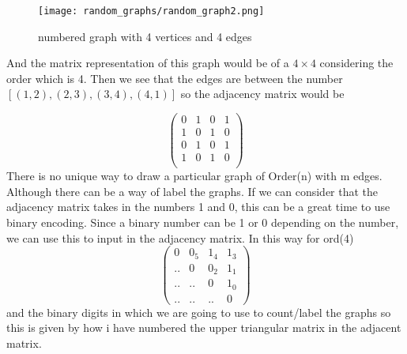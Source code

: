 \documentclass[12pt, a4paper]{Assignment}
\begin{document}
\begin{figure}[H]
	\centering
	\texttt{[image: random\_graphs/random\_graph2.png]}
	\caption{numbered graph with 4 vertices and 4 edges}
	\label{random_graph2}
\end{figure}
And the matrix representation of this graph would be of a $4\times 4$ considering the order which is 4.
Then we see that the edges are between the number $[(1,2), (2,3), (3,4), (4,1)]$ so the adjacency matrix would be

\begin{equation}
\begin{pmatrix}
0& 1& 0& 1\\
1 & 0 & 1 & 0\\
0 & 1 & 0 & 1\\
1 & 0 & 1 & 0\\
\end{pmatrix}	
\end{equation}
\newline
\newline
There is no unique way to draw a particular graph of Order(n) with m edges.
Although there can be a way of label the graphs.
If we can consider that the adjacency matrix takes in the numbers 1 and 0, this can be a great time to use binary encoding.
Since a binary number can be 1 or 0 depending on the number, we can use this to input in the adjacency matrix. 
In this way for ord(4)\begin{equation}
	\begin{pmatrix}
		0&0_5&1_4&1_3\\
		..&0&0_2&1_1\\
		..&..&0&1_0\\	
		..&..&..&0
	\end{pmatrix}\label{adj_mat}
\end{equation}
and the binary digits in which we are going to use to count/label the graphs so this is given by how i have numbered the upper triangular matrix in the adjacent matrix.
\end{document}
